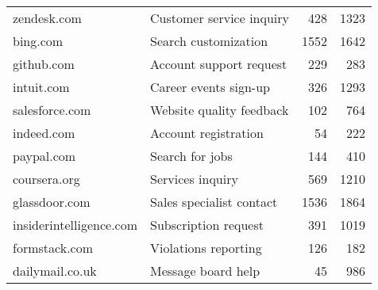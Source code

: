 \begin{table}
\begin{tabularx}{0.85\columnwidth}{llrr}
\footnotesize zendesk.com       & \footnotesize Customer service inquiry      		&	   \footnotesize 428     						  &	\footnotesize 1323			\\ %
\footnotesize bing.com          & \footnotesize  Search customization     &	   \footnotesize 1552     					  &	\footnotesize 1642						\\ %
\footnotesize github.com        & \footnotesize Account support request     		&	   \footnotesize 229     						  &	\footnotesize 283				\\ %
\footnotesize intuit.com        & \footnotesize Career events sign-up      			&	   \footnotesize 326     						  &	\footnotesize 1293			\\ %
\footnotesize salesforce.com    & \footnotesize Website quality feedback      		&	   \footnotesize 102     						  &	\footnotesize 764			\\ %
\footnotesize indeed.com        & \footnotesize Account registration      			&	   \footnotesize 54     						  &	\footnotesize 222				\\ %
\footnotesize paypal.com        & \footnotesize Search for jobs      					&		\footnotesize 144     						  &	\footnotesize 410			\\ %

\footnotesize coursera.org		& \footnotesize Services inquiry	&  \footnotesize 569  & \footnotesize 1210 \\
\footnotesize glassdoor.com		& \footnotesize Sales specialist contact	& \footnotesize 1536	& \footnotesize 1864	\\
\footnotesize insiderintelligence.com	& \footnotesize Subscription request &	\footnotesize 391	& \footnotesize 1019	\\
\footnotesize formstack.com		& \footnotesize Violations reporting	& \footnotesize 126	& \footnotesize 182	\\
\footnotesize dailymail.co.uk	& \footnotesize Message board help	& \footnotesize 45	& \footnotesize 986	\\


\end{tabularx}
\end{table}
